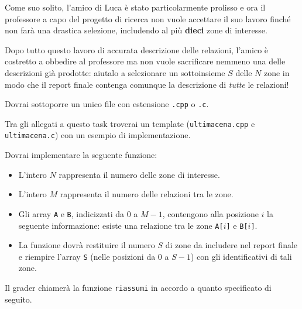 Come suo solito, l'amico di Luca è stato particolarmente prolisso e ora il professore a capo del progetto di ricerca non vuole accettare il suo lavoro finché non farà una drastica selezione, includendo al più \textbf{dieci} zone di interesse.

Dopo tutto questo lavoro di accurata descrizione delle relazioni, l'amico è costretto a obbedire al professore ma non vuole sacrificare nemmeno una delle descrizioni già prodotte: aiutalo a selezionare un sottoinsieme $S$ delle $N$ zone in modo che il report finale contenga comunque la descrizione di \emph{tutte} le relazioni!


\Implementation
Dovrai sottoporre un unico file con estensione \texttt{.cpp} o \texttt{.c}.

\begin{warning}
Tra gli allegati a questo task troverai un template (\texttt{ultimacena.cpp} e \texttt{ultimacena.c}) con un esempio di implementazione.
\end{warning}

\pagebreak

Dovrai implementare la seguente funzione:

\begin{itemize}[nolistsep]

    \begin{itemize}[nolistsep]
        \item L'intero $N$ rappresenta il numero delle zone di interesse.
        \item L'intero $M$ rappresenta il numero delle relazioni tra le zone.
        \item Gli array \texttt{A} e \texttt{B}, indicizzati da $0$ a $M-1$, contengono alla posizione $i$ la seguente informazione: esiste una relazione tra le zone \texttt{A[$i$]} e \texttt{B[$i$]}.
        \item La funzione dovrà restituire il numero $S$ di zone da includere nel report finale e riempire l'array \texttt{S} (nelle posizioni da $0$ a $S-1$) con gli identificativi di tali zone.

    \end{itemize}
\end{itemize}

Il grader chiamerà la funzione \texttt{riassumi} in accordo a quanto specificato di seguito.



